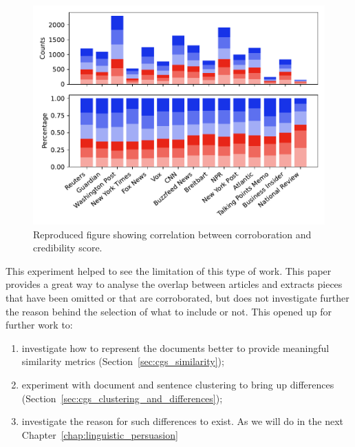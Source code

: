 \begin{figure}[!htbp]
    \centering
    \includegraphics[width=\linewidth]{figures/bountouridis_fig_3_noGA.pdf}
    \caption{Reproduced figure showing correlation between corroboration and credibility score.}
    \label{fig:figure_3_bountouridis_reproduced}
\end{figure}




This experiment helped to see the limitation of this type of work. %
This paper provides a great way to analyse the overlap between articles and extracts pieces that have been omitted or that are corroborated, but does not investigate further the reason behind the selection of what to include or not.
This opened up for further work to:
\begin{enumerate}
    \item investigate how to represent the documents better to provide meaningful similarity metrics (Section~\ref{sec:cgs_similarity});
    \item experiment with document and sentence clustering to bring up differences (Section~\ref{sec:cgs_clustering_and_differences});
    \item investigate the reason for such differences to exist. As we will do in the next Chapter~\ref{chap:linguistic_persuasion}
\end{enumerate}

